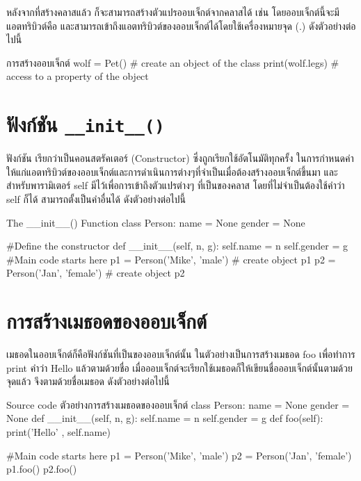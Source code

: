 หลังจากที่สร้างคลาสแล้ว ก็จะสามารถสร้างตัวแปรออบเจ็กต์จากคลาสได้ เช่น  โดยออบเจ็กต์นี้จะมีแอตทริบิวต์คือ  และสามารถเข้าถึงแอตทริบิวต์ของออบเจ็กต์ได้โดยใช้เครื่องหมายจุด (.) ดังตัวอย่างต่อไปนี้

\begin{codelist}{การสร้างออบเจ็กต์}{}
wolf = Pet() # create an object of the class
print(wolf.legs) # access to a property of the object
\end{codelist}


\section{ฟังก์ชัน \texttt{\_\_init\_\_()}}

ฟังก์ชัน  เรียกว่าเป็นคอนสตรัคเตอร์  (Constructor) ซึ่งถูกเรียกใช้อัตโนมัติทุกครั้ง ในการกำหนดค่าให้แก่แอตทริบิวต์ของออบเจ็กต์และการดำเนินการต่างๆที่จำเป็นเมื่อต้องสร้างออบเจ็กต์ขึ้นมา และสำหรับพารามิเตอร์ self มีไว้เพื่อการเข้าถึงตัวแปรต่างๆ ที่เป็นของคลาส โดยที่ไม่จำเป็นต้องใช้คำว่า self ก็ได้ สามารถตั้งเป็นคำอื่นได้ ดังตัวอย่างต่อไปนี้

\begin{codelist}{The \_\_init\_\_() Function}{}
class Person:
    name = None
    gender = None
    
    #Define the constructor
    def __init__(self, n, g):
        self.name = n
        self.gender = g
#Main code starts here
p1 = Person('Mike', 'male') # create object p1
p2 = Person('Jan', 'female') # create object p2
\end{codelist}


\section{การสร้างเมธอดของออบเจ็กต์}

เมธอดในออบเจ็กต์ก็คือฟังก์ชันที่เป็นของออบเจ็กต์นั้น ในตัวอย่างเป็นการสร้างเมธอด foo เพื่อทำการ print คำว่า Hello แล้วตามด้วยชื่อ เมื่อออบเจ็กต์จะเรียกใช้เมธอดก็ให้เขียนชื่อออบเจ็กต์นั้นตามด้วยจุดแล้ว จึงตามด้วยชื่อเมธอด ดังตัวอย่างต่อไปนี้

\begin{codelist}{Source code ตัวอย่างการสร้างเมธอดของออบเจ็กต์}{}
class Person:
    name = None
    gender = None
    def __init__(self, n, g):
        self.name = n
        self.gender = g
    def foo(self):
        print('Hello' , self.name)

#Main code starts here
p1 = Person('Mike', 'male')
p2 = Person('Jan', 'female')
p1.foo()
p2.foo()
\end{codelist}

